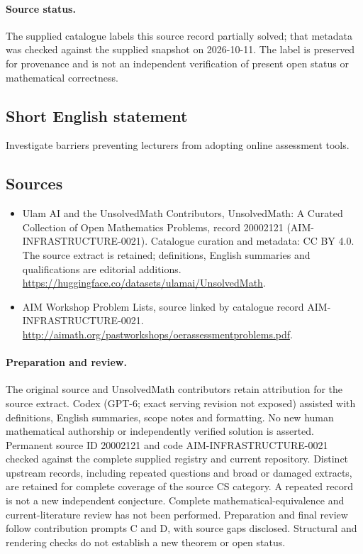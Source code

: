 \documentclass[11pt]{article}
\begin{document}
\paragraph{Source status.}
The supplied catalogue labels this source record partially solved; that metadata was checked against the supplied snapshot on 2026-10-11. The label is preserved for provenance and is not an independent verification of present open status or mathematical correctness.
\subsection{Short English statement}
Investigate barriers preventing lecturers from adopting online assessment tools.
\subsection{Sources}
\begin{itemize}
\item[\hypertarget{source:20002121:1}{S1}] Ulam AI and the UnsolvedMath Contributors, UnsolvedMath: A Curated Collection of Open Mathematics Problems, record 20002121 (AIM-INFRASTRUCTURE-0021). Catalogue curation and metadata: CC BY 4.0. The source extract is retained; definitions, English summaries and qualifications are editorial additions.
\url{https://huggingface.co/datasets/ulamai/UnsolvedMath}.
\item[\hypertarget{source:20002121:2}{S2}] AIM Workshop Problem Lists, source linked by catalogue record AIM-INFRASTRUCTURE-0021.
\url{http://aimath.org/pastworkshops/oerassessmentproblems.pdf}.
\end{itemize}
\paragraph{Preparation and review.}
The original source and UnsolvedMath contributors retain attribution for the source extract. Codex (GPT-6; exact serving revision not exposed) assisted with definitions, English summaries, scope notes and formatting. No new human mathematical authorship or independently verified solution is asserted. Permanent source ID 20002121 and code AIM-INFRASTRUCTURE-0021 checked against the complete supplied registry and current repository. Distinct upstream records, including repeated questions and broad or damaged extracts, are retained for complete coverage of the source CS category. A repeated record is not a new independent conjecture. Complete mathematical-equivalence and current-literature review has not been performed. Preparation and final review follow contribution prompts C and D, with source gaps disclosed. Structural and rendering checks do not establish a new theorem or open status.
\label{end:20002121}
\end{document}
